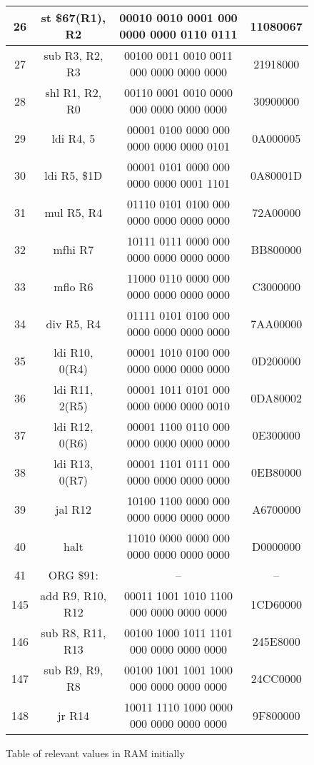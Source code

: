 \documentclass{article}
\begin{document}
\begin{figure}[h!]
\begin{center}
\begin{tabular}{|c|c|c|c|}
                26 & st \$67(R1), R2 & 00010 0010 0001 000 0000 0000 0110 0111 & 11080067 \\
                \hline
                27 & sub R3, R2, R3 & 00100 0011 0010 0011 000 0000 0000 0000 & 21918000 \\
                \hline
                28 & shl R1, R2, R0 & 00110 0001 0010 0000 000 0000 0000 0000 & 30900000 \\
                \hline
                29 & ldi R4, 5 & 00001 0100 0000 000 0000 0000 0000 0101 & 0A000005 \\
                \hline
                30 & ldi R5, \$1D & 00001 0101 0000 000 0000 0000 0001 1101 & 0A80001D \\
                \hline
                31 & mul R5, R4  & 01110 0101 0100 000 0000 0000 0000 0000 & 72A00000 \\
                \hline
                32 & mfhi R7 & 10111 0111 0000 000 0000 0000 0000 0000 & BB800000 \\
                \hline
                33 & mflo R6 & 11000 0110 0000 000 0000 0000 0000 0000 & C3000000 \\
                \hline
                34 & div R5, R4 & 01111 0101 0100 000 0000 0000 0000 0000 & 7AA00000 \\
                \hline
                35 & ldi R10, 0(R4) & 00001 1010 0100 000 0000 0000 0000 0000 & 0D200000 \\
                \hline
                36 & ldi R11, 2(R5) & 00001 1011 0101 000 0000 0000 0000 0010 & 0DA80002 \\
                \hline
                37 & ldi R12, 0(R6) & 00001 1100 0110 000 0000 0000 0000 0000 & 0E300000 \\
                \hline
                38 & ldi R13, 0(R7) & 00001 1101 0111 000 0000 0000 0000 0000 & 0EB80000 \\
                \hline
                39 & jal R12 & 10100 1100 0000 000 0000 0000 0000 0000 &A6700000 \\
                \hline
                40 & halt & 11010 0000 0000 000 0000 0000 0000 0000 &D0000000 \\
                \hline
                41 & ORG \$91: & – & –\\
                \hline
                145 &add R9, R10, R12 & 00011 1001 1010 1100 000 0000 0000 0000 & 1CD60000\\
                \hline
                146 &sub R8, R11, R13 & 00100 1000 1011 1101 000 0000 0000 0000 & 245E8000\\
                \hline
                147 & sub R9, R9, R8 & 00100 1001 1001 1000 000 0000 0000 0000 & 24CC0000\\
                \hline
                148 & jr R14 & 10011 1110 1000 0000 000 0000 0000 0000 & 9F800000\\
                \hline
            \end{tabular}
            \caption{Table of relevant values in RAM initially}
        \end{center}
    \end{figure}
    \\
\end{document}
